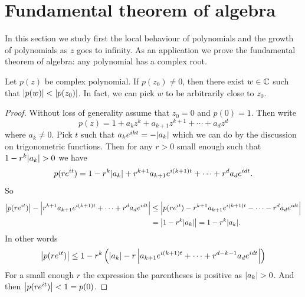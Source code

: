 
\sectionnewpage
\section{Fundamental theorem of algebra}
\label{sec:fundalgeb}


In this section we study first the local behaviour of polynomials
and the growth of polynomials as $z$ goes to infinity.  As an application
we prove the fundamental theorem of algebra: any polynomial
has a complex root.

\begin{lemma} \label{lemma:polyalwaysgetssmaller}
Let $p(z)$ be complex polynomial.  If $p(z_0) \not= 0$, then there
exist $w \in {\mathbb{C}}$ such that $\lvert {p(w)} \rvert < \lvert {p(z_0)} \rvert$.  In fact,
we can pick $w$ to be arbitrarily close to $z_0$.
\end{lemma}

\begin{proof}
Without loss of generality assume that $z_0 = 0$ and $p(0) = 1$.  Then write
\begin{equation*}
p(z) = 1+a_kz^k + a_{k+1}z^{k+1} + \cdots + a_d z^d
\end{equation*}
where $a_k \not= 0$.  Pick $t$ such that $a_k e^{ikt} = -\lvert {a_k} \rvert$ which
we can do by the discussion on trigonometric functions.  Then for
any $r > 0$ small enough such that
$1-r^k \lvert {a_k} \rvert > 0$ we have
\begin{equation*}
p(r e^{it}) =
1-r^k \lvert {a_k} \rvert + r^{k+1}a_{k+1}e^{i(k+1)t} + \cdots + r^{d}a_{d}e^{idt} .
\end{equation*}
So
\begin{equation*}
\begin{split}
\left\lvert {
p(r e^{it}) } \right\rvert - \left\lvert {
r^{k+1}a_{k+1}e^{i(k+1)t} + \cdots + r^{d}a_{d}e^{idt}
} \right\rvert
& \leq
\left\lvert {
p(r e^{it}) 
- r^{k+1}a_{k+1}e^{i(k+1)t} - \cdots - r^{d}a_{d}e^{idt}
} \right\rvert
\\
& =
\left\lvert {
1-r^k \lvert {a_k} \rvert
} \right\rvert
=
1-r^k \lvert {a_k} \rvert .
\end{split}
\end{equation*}
In other words
\begin{equation*}
\left\lvert {
p(r e^{it}) } \right\rvert
\leq
1-r^k \left( \lvert {a_k} \rvert
-
r
\left\lvert {
a_{k+1}e^{i(k+1)t} + \cdots + r^{d-k-1}a_{d}e^{idt}
} \right\rvert
\right)
\end{equation*}
For a small enough $r$ the expression the parentheses is positive
as $\lvert {a_k} \rvert > 0$.  And then $\left\lvert {p(re^{it})} \right\rvert < 1 = p(0)$.
\end{proof}

